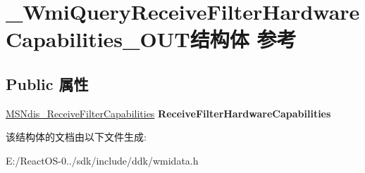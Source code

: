 \hypertarget{struct___wmi_query_receive_filter_hardware_capabilities___o_u_t}{}\section{\+\_\+\+Wmi\+Query\+Receive\+Filter\+Hardware\+Capabilities\+\_\+\+O\+U\+T结构体 参考}
\label{struct___wmi_query_receive_filter_hardware_capabilities___o_u_t}
\subsection*{Public 属性}
\begin{DoxyCompactItemize}
\item 
\mbox{\label{struct___wmi_query_receive_filter_hardware_capabilities___o_u_t_aa2328b00095794922cb43b3363ea43e3}} 
\hyperlink{struct___m_s_ndis___receive_filter_capabilities}{M\+S\+Ndis\+\_\+\+Receive\+Filter\+Capabilities} {\bfseries Receive\+Filter\+Hardware\+Capabilities}
\end{DoxyCompactItemize}


该结构体的文档由以下文件生成\+:\begin{DoxyCompactItemize}
\item 
E\+:/\+React\+O\+S-\/0../sdk/include/ddk/wmidata.\+h\end{DoxyCompactItemize}
